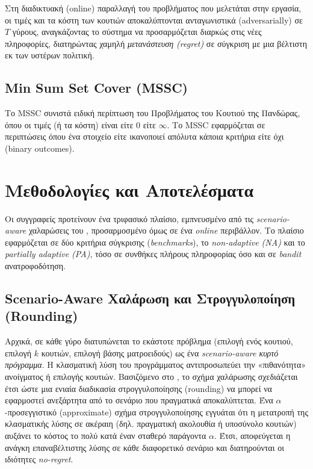 \documentclass[11pt,a4paper]{article}
\begin{document}
Στη διαδικτυακή (online) παραλλαγή του προβλήματος που μελετάται στην εργασία, οι τιμές και τα κόστη των κουτιών αποκαλύπτονται ανταγωνιστικά (adversarially) σε \( T \) γύρους, αναγκάζοντας το σύστημα να προσαρμόζεται διαρκώς στις νέες πληροφορίες, διατηρώντας χαμηλή \textit{μετανάστευση (regret)} σε σύγκριση με μια βέλτιστη εκ των υστέρων πολιτική.

\subsection{Min Sum Set Cover (MSSC)}
Το MSSC συνιστά ειδική περίπτωση του Προβλήματος του Κουτιού της Πανδώρας, όπου οι τιμές (ή τα κόστη) είναι είτε \( 0 \) είτε \( \infty \). Το MSSC εφαρμόζεται σε περιπτώσεις όπου ένα στοιχείο είτε ικανοποιεί απόλυτα κάποια κριτήρια είτε όχι (binary outcomes).

\pagebreak

\section{Μεθοδολογίες και Αποτελέσματα}
Οι συγγραφείς προτείνουν ένα τριφασικό πλαίσιο, εμπνευσμένο από τις \textit{scenario-aware} χαλαρώσεις του \cite{CGT+20}, προσαρμοσμένο όμως σε ένα \textit{online} περιβάλλον. Το πλαίσιο εφαρμόζεται σε δύο κριτήρια σύγκρισης (\textit{benchmarks}), το \textit{non-adaptive (NA)} και το \textit{partially adaptive (PA)}, τόσο σε συνθήκες πλήρους πληροφορίας όσο και σε \textit{bandit} ανατροφοδότηση.

\subsection*{Scenario-Aware Χαλάρωση και Στρογγυλοποίηση (Rounding)}
Αρχικά, σε κάθε γύρο διατυπώνεται το εκάστοτε πρόβλημα (επιλογή ενός κουτιού, επιλογή $k$ κουτιών, επιλογή βάσης ματροειδούς) ως ένα \textit{scenario-aware κυρτό πρόγραμμα}. Η κλασματική λύση του προγράμματος αντιπροσωπεύει την «πιθανότητα» ανοίγματος ή επιλογής κουτιών. Βασιζόμενο στο \cite{CGT+20}, το σχήμα χαλάρωσης σχεδιάζεται έτσι ώστε μια ενιαία διαδικασία στρογγυλοποίησης (rounding) να μπορεί να εφαρμοστεί ανεξάρτητα από το σενάριο που πραγματικά αποκαλύπτεται. Ένα $\alpha$-προσεγγιστικό (approximate) σχήμα στρογγυλοποίησης εγγυάται ότι η μετατροπή της κλασματικής λύσης σε ακέραιη (δηλ. πραγματική ακολουθία ή υποσύνολο κουτιών) αυξάνει το κόστος το πολύ κατά έναν σταθερό παράγοντα $\alpha$. Έτσι, αποφεύγεται η ανάγκη επαναβέλτιστης λύσης σε κάθε διαφορετικό σενάριο και διατηρούνται οι ιδιότητες \textit{no-regret}.
\end{document}
